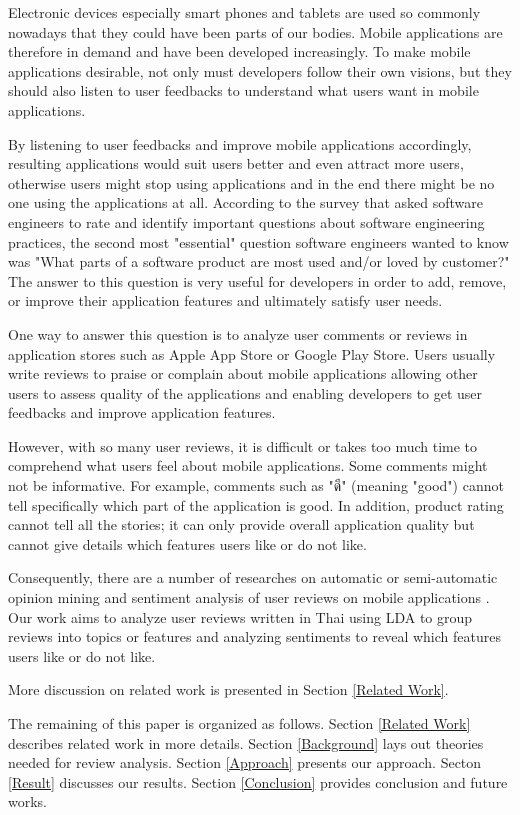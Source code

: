
Electronic devices especially smart phones and tablets are used so commonly nowadays that they could have been parts of our bodies. Mobile applications are therefore in demand and have been developed increasingly. To make mobile applications desirable, not only must developers follow their own visions, but they should also listen to user feedbacks to understand what users want in mobile applications.

By listening to user feedbacks and improve mobile applications accordingly, resulting applications would suit users better and even attract more users, otherwise users might stop using applications and in the end there might be no one using the applications at all. According to the survey \cite{145Q} that asked software engineers to rate and identify important questions about software engineering practices, the second most "essential" question software engineers wanted to know was "What parts of a software product are most used and/or loved by customer?" The answer to this question is very useful for developers in order to add, remove, or improve their application features and ultimately satisfy user needs.

One way to answer this question is to analyze user comments or reviews in application stores such as Apple App Store or Google Play Store. Users usually write reviews to praise or complain about mobile applications allowing other users to assess quality of the applications and enabling developers to get user feedbacks and improve application features. 

However, with so many user reviews, it is difficult or takes too much time to comprehend what users feel about mobile applications. Some comments might not be informative. For example, comments such as "ดี" (meaning "good") cannot tell specifically which part of the application is good. In addition, product rating cannot tell all the stories; it can only provide overall application quality but cannot give details which features users like or do not like.

Consequently, there are a number of researches on automatic or semi-automatic opinion mining and sentiment analysis of user reviews on mobile applications \cite{ar-miner,userslikefeature,keywordmining,Leopairote1, Leopairote2}. Our work aims to analyze user reviews written in Thai using LDA to group reviews into topics or features and analyzing sentiments to reveal which features users like or do not like. 

 More discussion on related work is presented in Section \ref{Related Work}.

The remaining of this paper is organized as follows. Section \ref{Related Work} describes related work in more details. Section \ref{Background} lays out theories needed for review analysis. Section \ref{Approach} presents our approach. Secton \ref{Result} discusses our results. Section \ref{Conclusion} provides conclusion and future works. 
